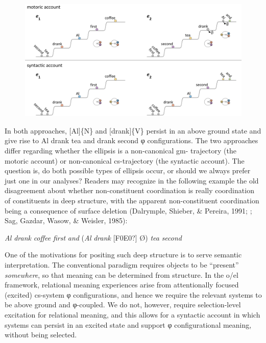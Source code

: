   
\begin{figure}
\includegraphics[width=\textwidth]{figures/Tilsen-img145.png}
\caption{\missingcaption}
\label{fig:}
\end{figure}
 

  In both approaches, [Al]\{N\} and [drank]\{V\} persist in an above ground state and give rise to {\textbar}Al drank tea{\textbar} and {\textbar}drank second{\textbar} φ configurations. The two approaches differ regarding whether the ellipsis is a non-canonical gm- trajectory (the motoric account) or non-canonical cs-trajectory (the syntactic account). The question is, do both possible types of ellipsis occur, or should we always prefer just one in our analyses? Readers may recognize in the following example the old disagreement about whether non-constituent coordination is really coordination of constituents in deep structure, with the apparent non-constituent coordination being a consequence of surface deletion (Dalrymple, Shieber, \& Pereira, 1991; \citealt{Merchant2001}; Sag, Gazdar, Wasow, \& Weisler, 1985): 

\textit{Al} \textit{drank} \textit{coffee} \textit{first} \textit{and} (\textit{Al} \textit{drank} [F0E0?] Ø) \textit{tea} \textit{second}

  One of the motivations for positing such deep structure is to serve semantic interpretation. The conventional paradigm requires objects to be “present” \textit{somewhere}, so that meaning can be determined from structure. In the o/el framework, relational meaning experiences arise from attentionally focused (excited) cs-system φ configurations, and hence we require the relevant systems to be above ground and φ-coupled. We do not, however, require selection-level excitation for relational meaning, and this allows for a syntactic account in which systems can persist in an excited state and support φ configurational meaning, without being selected. 

